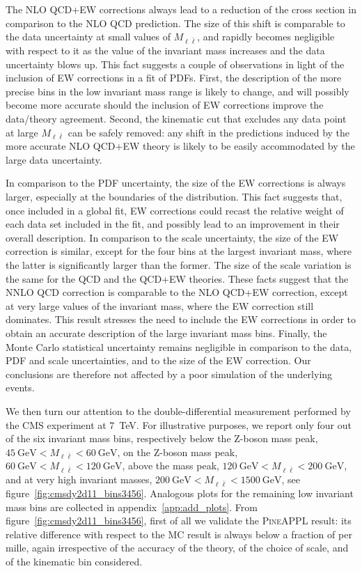 The NLO QCD+EW corrections always lead to a reduction of the cross section in
comparison to the NLO QCD prediction. The size of this shift is comparable to
the data uncertainty at small values of $M_{\ell\bar\ell}$, and rapidly becomes
negligible with respect to it as the value of the invariant mass increases
and the data uncertainty blows up. This fact suggests a couple of observations
in light of the inclusion of EW corrections in a fit of PDFs. First, the
description of the more precise bins in the low invariant mass range is likely
to change, and will possibly become more accurate should the inclusion of EW
corrections improve the data/theory agreement. Second, the kinematic cut that
excludes any data point at large $M_{\ell\bar\ell}$ can be safely removed: any
shift in the predictions induced by the more accurate NLO QCD+EW theory is
likely to be easily accommodated by the large data uncertainty.

In comparison to the PDF uncertainty, the size of the EW corrections is
always larger, especially at the boundaries of the distribution. This fact
suggests that, once included in a global fit, EW corrections could recast the
relative weight of each data set included in the fit, and possibly lead to
an improvement in their overall description. In comparison to the scale
uncertainty, the size of the EW correction is similar, except for the four bins
at the largest invariant mass, where the latter is significantly larger than
the former. The size of the scale variation is the same for the QCD and the
QCD+EW theories. These facts suggest that the NNLO QCD correction is comparable
to the NLO QCD+EW correction, except at very large values of the invariant mass,
where the EW correction still dominates. This result stresses the need to
include the EW corrections in order to obtain an accurate description of the
large invariant mass bins. Finally, the Monte Carlo statistical
uncertainty remains negligible in comparison to the data, PDF and scale
uncertainties, and to the size of the EW correction. Our conclusions are
therefore not affected by a poor simulation of the underlying events.

We then turn our attention to the double-differential measurement performed by
the CMS experiment at \SI{7}{\tera\electronvolt}. For illustrative purposes, we report only four out
of the six invariant mass bins, respectively below the Z-boson mass peak,
$\SI{45}{\giga\electronvolt}<M_{\ell\bar\ell}<\SI{60}{\giga\electronvolt}$, on the Z-boson mass peak,
$\SI{60}{\giga\electronvolt}<M_{\ell\bar\ell}<\SI{120}{\giga\electronvolt}$, above the mass peak,
$\SI{120}{\giga\electronvolt}<M_{\ell\bar\ell}<\SI{200}{\giga\electronvolt}$, and at very high invariant masses,
$\SI{200}{\giga\electronvolt}<M_{\ell\bar\ell}<\SI{1500}{\giga\electronvolt}$, see figure~\ref{fig:cmsdy2d11_bins3456}.
Analogous plots for the remaining low invariant mass bins are collected in
appendix~\ref{app:add_plots}. From figure~\ref{fig:cmsdy2d11_bins3456},
first of all we validate the \textsc{PineAPPL} result: its relative difference
with respect to the MC result is always below a fraction of per mille,
again irrespective of the accuracy of the theory, of the choice of scale, and
of the kinematic bin considered. 

